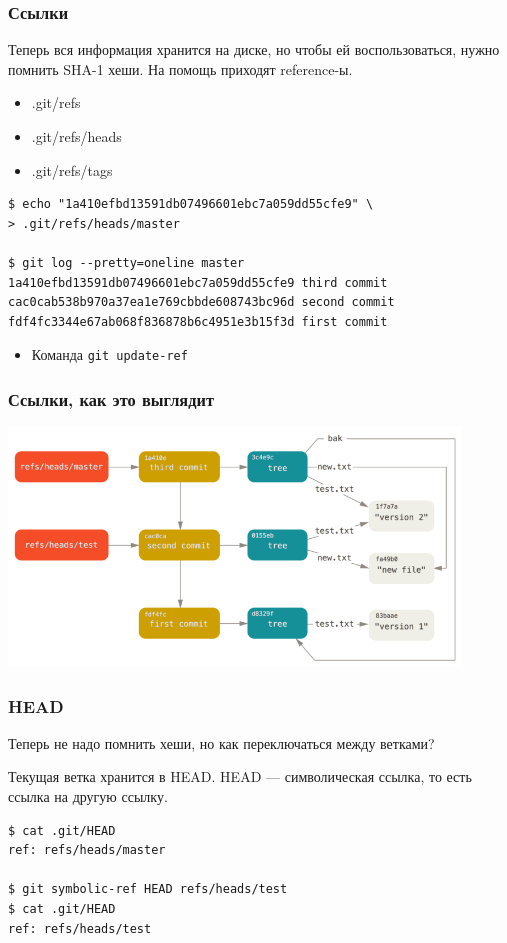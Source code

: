 \documentclass[xetex,mathserif,serif]{beamer}
\begin{document}
    \begin{frame}[fragile]
        \frametitle{Ссылки}
        Теперь вся информация хранится на диске, но чтобы ей воспользоваться, нужно помнить SHA-1 хеши. На помощь приходят reference-ы. 

        \begin{itemize}
            \item .git/refs
            \item .git/refs/heads
            \item .git/refs/tags
        \end{itemize}

        \begin{verbatim}
$ echo "1a410efbd13591db07496601ebc7a059dd55cfe9" \
> .git/refs/heads/master

$ git log --pretty=oneline master
1a410efbd13591db07496601ebc7a059dd55cfe9 third commit
cac0cab538b970a37ea1e769cbbde608743bc96d second commit
fdf4fc3344e67ab068f836878b6c4951e3b15f3d first commit
        \end{verbatim}
        \begin{itemize}
            \item Команда \verb|git update-ref|
        \end{itemize}
    \end{frame}

    \begin{frame}
        \frametitle{Ссылки, как это выглядит}
        \begin{center}
            \includegraphics[width=0.9\textwidth]{gitRefs.png}
        \end{center}
    \end{frame}

    \begin{frame}[fragile]
        \frametitle{HEAD}
        Теперь не надо помнить хеши, но как переключаться между ветками?

        Текущая ветка хранится в HEAD. HEAD --- символическая ссылка, то есть ссылка на другую ссылку.
        \begin{verbatim}
$ cat .git/HEAD
ref: refs/heads/master

$ git symbolic-ref HEAD refs/heads/test
$ cat .git/HEAD
ref: refs/heads/test
        \end{verbatim}
    \end{frame}
\end{document}

